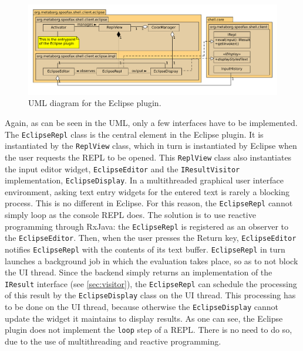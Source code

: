 \begin{figure}[h]
  \includegraphics[width=\textwidth]{uml-eclipse}
  \caption{UML diagram for the Eclipse plugin.}
  \label{fig:uml-eclipse}
\end{figure}

Again, as can be seen in the UML, only a few interfaces have to be implemented.
The \texttt{EclipseRepl} class is the central element in the Eclipse plugin.
It is instantiated by the \texttt{ReplView} class, which in turn is
instantiated by Eclipse when the user requests the REPL to be opened. This
\texttt{ReplView} class also instantiates the input editor widget,
\texttt{EclipseEditor} and the \texttt{IResultVisitor} implementation,
\texttt{EclipseDisplay}.
In a multithreaded graphical user interface environment, asking text entry
widgets for the entered text is rarely a blocking process. This is no different
in Eclipse. For this reason, the \texttt{EclipseRepl} cannot simply loop as the
console REPL does. The solution is to use reactive programming through RxJava:
the \texttt{EclipseRepl} is registered as an observer to the
\texttt{EclipseEditor}. Then, when the user presses the Return key,
\texttt{EclipseEditor} notifies \texttt{EclipseRepl} with the contents of its
text buffer. \texttt{EclipseRepl} in turn launches a background job in which the
evaluation takes place, so as to not block the UI thread. Since the backend
simply returns an implementation of the \texttt{IResult} interface (see
\cref{sec:visitor}), the \texttt{EclipseRepl} can schedule the processing of this
result by the \texttt{EclipseDisplay} class on the UI thread. This processing
has to be done on the UI thread, because otherwise the \texttt{EclipseDisplay}
cannot update the widget it maintains to display results.
As one can see, the Eclipse plugin does not implement the \texttt{loop} step of
a REPL. There is no need to do so, due to the use of multithreading and reactive
programming.

